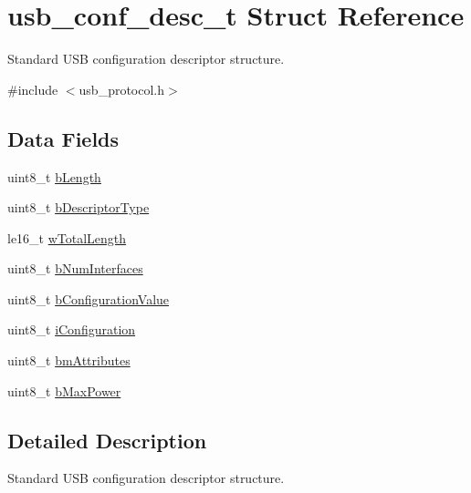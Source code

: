 \hypertarget{structusb__conf__desc__t}{
\section{usb\-\_\-conf\-\_\-desc\-\_\-t \-Struct \-Reference}
\label{structusb__conf__desc__t}
}


\-Standard \-U\-S\-B configuration descriptor structure.  




{\ttfamily \#include $<$usb\-\_\-protocol.\-h$>$}

\subsection*{\-Data \-Fields}
\begin{DoxyCompactItemize}
\item 
uint8\-\_\-t \hyperlink{structusb__conf__desc__t_acd480c332f94a519f5fe6f947801aa21}{b\-Length}
\item 
uint8\-\_\-t \hyperlink{structusb__conf__desc__t_a0fa7aed7ce2f5284a7d7118e96248076}{b\-Descriptor\-Type}
\item 
le16\-\_\-t \hyperlink{structusb__conf__desc__t_afa2ba7e6e481d99b0dd4c40744efc5bb}{w\-Total\-Length}
\item 
uint8\-\_\-t \hyperlink{structusb__conf__desc__t_a445aa9404b196af184c74d3f8dfe691f}{b\-Num\-Interfaces}
\item 
uint8\-\_\-t \hyperlink{structusb__conf__desc__t_a74bb8bfa73467043c5135ed02381e291}{b\-Configuration\-Value}
\item 
uint8\-\_\-t \hyperlink{structusb__conf__desc__t_a87ae189b300bdce2b61e690797218e79}{i\-Configuration}
\item 
uint8\-\_\-t \hyperlink{structusb__conf__desc__t_a46f189582cb2ccdd46ded73ebd518d74}{bm\-Attributes}
\item 
uint8\-\_\-t \hyperlink{structusb__conf__desc__t_aa514d0a8b697cc3035bbaea8553638ec}{b\-Max\-Power}
\end{DoxyCompactItemize}


\subsection{\-Detailed \-Description}
\-Standard \-U\-S\-B configuration descriptor structure. 

